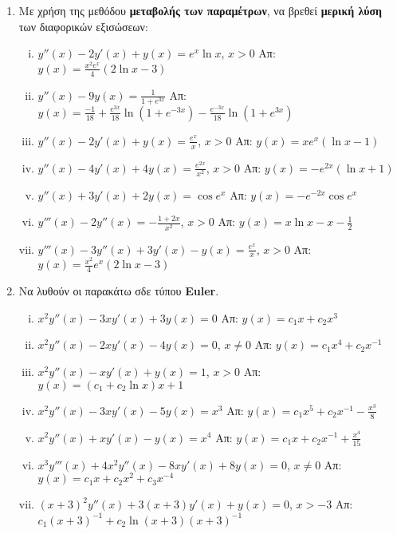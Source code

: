 \begin{enumerate}
  \item Με χρήση της μεθόδου \textbf{μεταβολής των παραμέτρων}, να βρεθεί 
    \textbf{μερική λύση} των διαφορικών εξισώσεων:
    \begin{enumerate}[i)]
      \item $y''(x)-2y'(x)+y(x)=e^{x}\ln x$, $x>0$ 
        \hfill Απ: $y(x)=\frac{x^{2}e^{x}}{4}(2\ln x-3)$
      \item $y''(x)-9y(x)=\frac{1}{1+e^{3x}}$ 
        \hfill Απ: $y(x)=\frac{-1}{18}+\frac{e^{3x}}{18}\ln (1+e^{-3x})-
        \frac{e^{-3x}}{18}\ln(1+e^{3x})$
      \item $y''(x)-2y'(x)+y(x)=\frac{e^x}{x}$, $x>0$ \hfill Απ: $y(x)=xe^{x}(\ln x-1)$
      \item $y''(x)-4y'(x)+4y(x)=\frac{e^{2x}}{x^{2}}$, $x>0$ 
        \hfill Απ: $y(x)=-e^{2x}(\ln x +1)$
      \item $y''(x)+3y'(x)+2y(x)=\cos e^{x}$ \hfill Απ: $y(x)=-e^{-2x}\cos e^{x}$
      \item $y'''(x)-2y''(x)=-\frac{1+2x}{x^{2}}$, $x>0$ 
        \hfill Απ: $y(x)=x\ln x-x -\frac{1}{2}$
      \item $y'''(x)-3y''(x)+3y'(x)-y(x)=\frac{e^{x}}{x}$, $x>0$ 
        \hfill Απ: $y(x)=\frac{x^{2}}{4}e^{x}(2\ln x-3)$
    \end{enumerate}

  \item Να λυθούν οι παρακάτω σδε τύπου \textlatin{\textbf{Euler}.}
    \begin{enumerate}[i)]
      \item $ x^{2}y''(x)-3xy'(x)+3y(x)=0 $ \hfill Απ: $ y(x)=c_{1}x + c_{2}x^{3} $
      \item $ x^{2}y''(x)-2xy'(x)-4y(x)=0 $,\; $ x \neq 0 $ \hfill Απ: $
        y(x)=c_{1}x^{4}+ c_{2} x^{-1} $ 
      \item $ x^{2}y''(x)-xy'(x)+y(x)=1 $,\; $ x>0 $ \hfill Απ: $ y(x)=(c_{1}+c_{2}
        \ln{x})x + 1 $  
      \item $ x^{2}y''(x)-3xy'(x)-5y(x)=x^{3} $ \hfill Απ: $ y(x)=c_{1}x^{5}+ c_{2}
        x^{-1}- \frac{x^{3}}{8} $ 
      \item $ x^{2}y''(x)+xy'(x)-y(x)=x^{4} $ \hfill Απ: $ y(x)=c_{1}x+c_{2}x^{-1}+
        \frac{x^{4}}{15} $ 
      \item $ x^{3}y'''(x)+4x^{2}y''(x)-8xy'(x)+8y(x)=0 $,\; $ x \neq 0 $ \hfill Απ:
        $y(x)=c_{1}x+c_{2}x^{2}+c_{3}x^{-4}$ 
      \item \label{eul} $ (x+3)^{2}y''(x)+3(x+3)y'(x)+y(x)=0 $,\; $ x>-3 $ \hfill Απ:
        $ c_{1}
        (x+3)^{-1} + c_{2}\ln(x+3)(x+3)^{-1} $
    \end{enumerate}


\end{enumerate}
